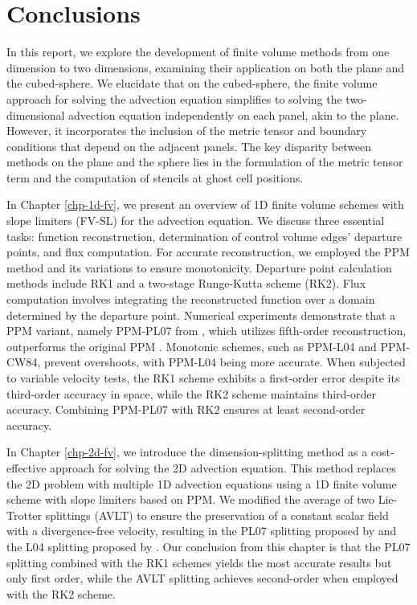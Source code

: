 \chapter{Conclusions}
\label{chp-conclusions}

In this report, we explore the development of finite volume methods from one dimension to two dimensions,
examining their application on both the plane and the cubed-sphere.
We elucidate that on the cubed-sphere, the finite volume approach for solving the advection equation simplifies to solving the two-dimensional
advection equation independently on each panel, akin to the plane.
However, it incorporates the inclusion of the metric tensor and boundary conditions that depend on the adjacent panels.
The key disparity between methods on the plane and the sphere lies in the formulation of the metric tensor term and the computation of stencils at ghost cell positions.


In Chapter \ref{chp-1d-fv}, we present an overview of 1D finite volume schemes with slope limiters (FV-SL) for the advection equation.
We discuss three essential tasks: function reconstruction, determination of control volume edges' departure points, and flux computation.
For accurate reconstruction, we employed the PPM method and its variations to ensure monotonicity.
Departure point calculation methods include RK1 and a two-stage Runge-Kutta scheme (RK2).
Flux computation involves integrating the reconstructed function over a domain determined by the departure point.
Numerical experiments demonstrate that a PPM variant, namely PPM-PL07 from \citet{putman:2007}, which utilizes fifth-order reconstruction,
outperforms the original PPM \citep{colella:1984}. Monotonic schemes, such as PPM-L04 and PPM-CW84, prevent overshoots, with PPM-L04 being more accurate.
When subjected to variable velocity tests, the RK1 scheme exhibits a first-order error despite its third-order accuracy in space,
while the RK2 scheme maintains third-order accuracy. Combining PPM-PL07 with RK2 ensures at least second-order accuracy.

In Chapter \ref{chp-2d-fv}, we introduce the dimension-splitting method as a cost-effective approach for solving the 2D advection equation.
This method replaces the 2D problem with multiple 1D advection equations using a 1D finite volume scheme with slope limiters based on PPM.
We modified the average of two Lie-Trotter splittings (AVLT) to ensure the preservation of a constant scalar field with a divergence-free velocity,
resulting in the PL07 splitting proposed by \citet{putman:2007} and the L04 splitting proposed by \citet{lin:2004}.
Our conclusion from this chapter is that the PL07 splitting combined with the RK1 schemes yields the most accurate results but only first order,
while the AVLT splitting achieves second-order when employed with the RK2 scheme.


